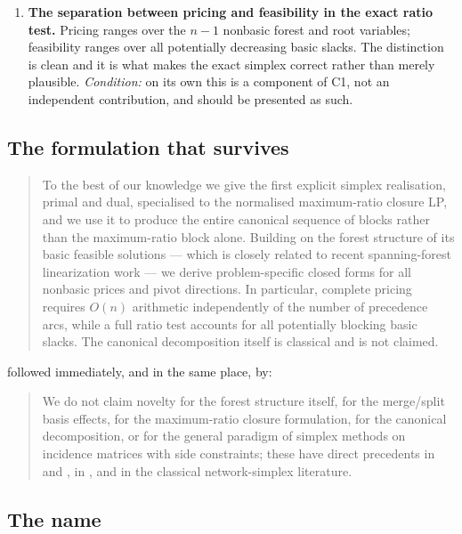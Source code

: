 \begin{enumerate}[label=C\arabic*.,leftmargin=*]
\item \textbf{The separation between pricing and feasibility in the exact ratio
      test.} Pricing ranges over the $n-1$ nonbasic forest and root variables;
      feasibility ranges over all potentially decreasing basic slacks. The
      distinction is clean and it is what makes the exact simplex correct rather
      than merely plausible. \emph{Condition:} on its own this is a component of
      C1, not an independent contribution, and should be presented as such.
\end{enumerate}

\subsection{The formulation that survives}

\begin{quote}
To the best of our knowledge we give the first explicit simplex realisation,
primal and dual, specialised to the normalised maximum-ratio closure LP, and we
use it to produce the entire canonical sequence of blocks rather than the
maximum-ratio block alone. Building on the forest structure of its basic
feasible solutions --- which is closely related to recent spanning-forest
linearization work --- we derive problem-specific closed forms for all nonbasic
prices and pivot directions. In particular, complete pricing requires $O(n)$
arithmetic independently of the number of precedence arcs, while a full ratio
test accounts for all potentially blocking basic slacks. The canonical
decomposition itself is classical and is not claimed.
\end{quote}

\noindent followed immediately, and in the same place, by:

\begin{quote}
We do not claim novelty for the forest structure itself, for the merge/split
basis effects, for the maximum-ratio closure formulation, for the canonical
decomposition, or for the general paradigm of simplex methods on incidence
matrices with side constraints; these have direct precedents in
\citet{Wuille2025} and \citet{MollakhaniEtAl2026}, in \citet{Yang2026}, and in
the classical network-simplex literature.
\end{quote}

\subsection{The name}\label{sec:name}

